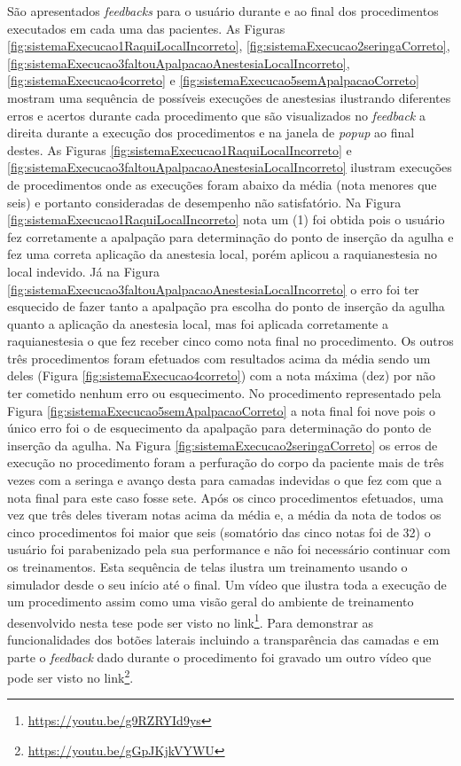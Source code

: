 São apresentados \textit{feedbacks} para o usuário durante e ao final dos procedimentos executados em cada uma das pacientes. As Figuras \ref{fig:sistemaExecucao1RaquiLocalIncorreto}, \ref{fig:sistemaExecucao2seringaCorreto}, \ref{fig:sistemaExecucao3faltouApalpacaoAnestesiaLocalIncorreto}, \ref{fig:sistemaExecucao4correto} e \ref{fig:sistemaExecucao5semApalpacaoCorreto} mostram uma sequência de possíveis execuções de anestesias ilustrando diferentes erros e acertos durante cada procedimento que são visualizados no \textit{feedback} a direita durante a execução dos procedimentos e na janela de \textit{popup} ao final destes. As Figuras \ref{fig:sistemaExecucao1RaquiLocalIncorreto} e \ref{fig:sistemaExecucao3faltouApalpacaoAnestesiaLocalIncorreto} ilustram execuções de procedimentos onde as execuções foram abaixo da média (nota menores que seis) e portanto consideradas de desempenho não satisfatório. Na Figura \ref{fig:sistemaExecucao1RaquiLocalIncorreto}  nota um (1) foi obtida pois o usuário fez corretamente a apalpação para determinação do ponto de inserção da agulha e fez uma correta aplicação da anestesia local, porém aplicou a raquianestesia no local indevido. Já na Figura \ref{fig:sistemaExecucao3faltouApalpacaoAnestesiaLocalIncorreto} o erro foi ter esquecido de fazer tanto a apalpação pra escolha do ponto de inserção da agulha quanto a aplicação da anestesia local, mas foi aplicada corretamente a raquianestesia o que fez receber cinco como nota final no procedimento. Os outros três procedimentos foram efetuados com resultados acima da média sendo um deles (Figura \ref{fig:sistemaExecucao4correto}) com a nota máxima (dez) por não ter cometido nenhum erro ou esquecimento. No procedimento representado pela Figura \ref{fig:sistemaExecucao5semApalpacaoCorreto} a nota final foi nove pois o único erro foi o de esquecimento da apalpação para determinação do ponto de inserção da agulha. Na Figura \ref{fig:sistemaExecucao2seringaCorreto} os erros de execução no procedimento foram a perfuração do corpo da paciente mais de três vezes com a seringa e avanço desta para camadas indevidas o que fez com que a nota final para este caso fosse sete. 
Após os cinco procedimentos efetuados, uma vez que três deles tiveram notas acima da média e, a média da nota de todos os cinco procedimentos foi maior que seis (somatório das cinco notas foi de 32) o usuário foi parabenizado pela sua performance e não foi necessário continuar com os treinamentos. Esta sequência de telas ilustra um treinamento usando o simulador desde o seu início até o final. Um vídeo que ilustra toda a execução de um procedimento assim como uma visão geral do ambiente de treinamento desenvolvido nesta tese pode ser visto no link\footnote{\url{https://youtu.be/g9RZRYId9ys}}. Para demonstrar as funcionalidades dos botões laterais incluindo a transparência das camadas e em parte o \textit{feedback} dado durante o procedimento foi gravado um outro vídeo que pode ser visto no link\footnote{\url{https://youtu.be/gGpJKjkVYWU}}.

